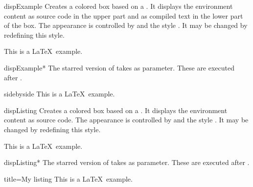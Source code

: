 {\let\xdispExample\dispExample
  \let\endxdispExample\enddispExample
\begin{docEnvironment}[doc updated=2014-10-10]{dispExample}{}
  Creates a colored box based on a .
  It displays the environment content as source code in the upper part
  and as compiled text in the lower part of the box.
  The appearance is controlled by 
  and the style . It may be
  changed by redefining this style.
{
\begin{xdispExample}
\begin{dispExample}
This is a \LaTeX\ example.
\end{dispExample}
\end{xdispExample}
}
\end{docEnvironment}}


{\let\xdispExample\dispExample
  \let\endxdispExample\enddispExample
\begin{docEnvironment}[doc updated=2014-10-10]{dispExample*}{}
  The starred version of  takes  
  as parameter. These  are executed after .
\begin{xdispExample}
\begin{dispExample*}{sidebyside}
This is a \LaTeX\ example.
\end{dispExample*}
\end{xdispExample}
\end{docEnvironment}}


\clearpage
\begin{docEnvironment}{dispListing}{}
  Creates a colored box based on a .
  It displays the environment content as source code.
  The appearance is controlled by 
  and the style . It may be
  changed by redefining this style.
\begin{dispExample}
\begin{dispListing}
This is a \LaTeX\ example.
\end{dispListing}
\end{dispExample}
\end{docEnvironment}

\begin{docEnvironment}{dispListing*}{}
  The starred version of  takes  
  as parameter. These  are executed after .
\begin{dispExample}
\begin{dispListing*}{title=My listing}
This is a \LaTeX\ example.
\end{dispListing*}
\end{dispExample}
\end{docEnvironment}


